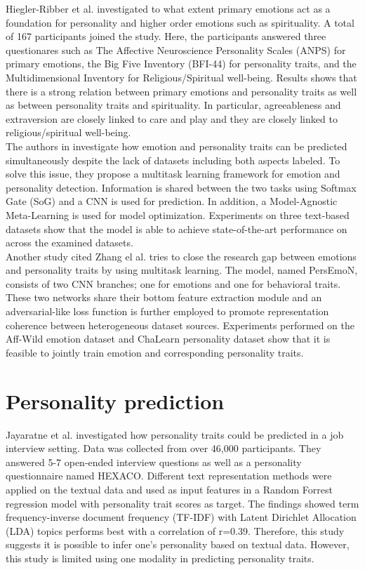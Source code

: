 Hiegler-Ribber et al. \cite{personality_emotions_link} investigated to what extent primary emotions act as a foundation for personality and higher order emotions such as spirituality. A total of 167 participants joined the study. Here, the participants answered three questionares such as The Affective Neuroscience Personality Scales (ANPS) for primary emotions, the Big Five Inventory (BFI-44) for personality traits, and the Multidimensional Inventory for Religious/Spiritual well-being. Results shows that there is a strong relation between primary emotions and personality traits as well as between personality traits and spirituality. In particular, agreeableness and extraversion are closely linked to care and play and they are closely linked to religious/spiritual well-being. \\ 

The authors in \cite{personality-emotion1-LI2022340} investigate how emotion and personality traits can be predicted simultaneously despite the lack of datasets including both aspects labeled. To solve this issue, they propose a multitask learning framework for emotion and personality detection. Information is shared between the two tasks using Softmax Gate (SoG) and a CNN is used for prediction. In addition, a Model-Agnostic Meta-Learning is used for model optimization. Experiments on three text-based datasets show that the model is able to achieve state-of-the-art performance on across the examined datasets. \\

Another study cited Zhang el al. \cite{personality-emotion2-8897617} tries to close the research gap between emotions and personality traits by using multitask learning. The model, named PersEmoN, consists of two CNN branches; one for emotions and one for behavioral traits. These two networks share their bottom feature extraction module and an adversarial-like loss function is further employed to promote representation coherence between heterogeneous dataset sources. Experiments performed on the Aff-Wild emotion dataset and ChaLearn personality dataset show that it is feasible to jointly train emotion and corresponding personality traits. 

\section{Personality prediction}
Jayaratne et al. \cite{personality-prediction-questions-9121971} investigated how personality traits could be predicted in a job interview setting. Data was collected from over 46,000 participants. They answered 5-7 open-ended interview questions as well as a personality questionnaire named HEXACO. Different text representation methods were applied on the textual data and used as input features in a Random Forrest regression model with personality trait scores as target. The findings showed term frequency-inverse document frequency (TF-IDF) with Latent Dirichlet Allocation (LDA) topics performs best with a correlation of r=0.39. Therefore, this study suggests it is possible to infer one's personality based on textual data. However, this study is limited using one modality in predicting personality traits.  \\ 

